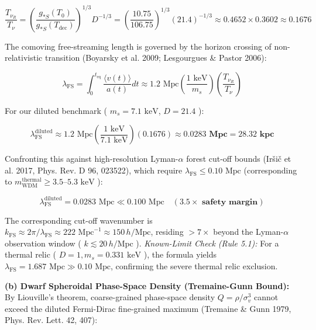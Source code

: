 \documentclass[11pt,a4paper]{article}
\theoremstyle{definition}\newtheorem{definition}{Definition}
\theoremstyle{remark}\newtheorem{remark}{Remark}
\begin{document}
\begin{equation}
\frac{T_{\nu_R}}{T_\nu} = \left(\frac{g_{*S}(T_0)}{g_{*S}(T_{\text{dec}})}\right)^{1/3} D^{-1/3} = \left(\frac{10.75}{106.75}\right)^{1/3} (21.4)^{-1/3} \approx 0.4652 \times 0.3602 \approx \mathbf{0.1676}
\end{equation}


The comoving free-streaming length is governed by the horizon crossing of non-relativistic transition (Boyarsky et al. 2009; Lesgourgues \& Pastor 2006):


\begin{equation}
\lambda_{\text{FS}} = \int_0^{t_{\text{eq}}} \frac{\langle v(t)\rangle}{a(t)} dt \approx 1.2\text{ Mpc} \left(\frac{1\text{ keV}}{m_s}\right) \left(\frac{T_{\nu_R}}{T_\nu}\right)
\end{equation}


For our diluted benchmark ( $m_s = 7.1\text{ keV}$, $D = 21.4$ ):


\begin{equation}
\lambda_{\text{FS}}^{\text{diluted}} \approx 1.2\text{ Mpc} \left(\frac{1\text{ keV}}{7.1\text{ keV}}\right) (0.1676) \approx \mathbf{0.0283\text{ Mpc}} = \mathbf{28.32\text{ kpc}}
\end{equation}


Confronting this against high-resolution Lyman-$\alpha$ forest cut-off bounds (Iršič et al. 2017, Phys. Rev. D 96, 023522), which require $\lambda_{\text{FS}} \le 0.10\text{ Mpc}$ (corresponding to $m_{\text{WDM}}^{\text{thermal}} \ge 3.5\text{--}5.3\text{ keV}$ ):


\begin{equation}
\lambda_{\text{FS}}^{\text{diluted}} = 0.0283\text{ Mpc} \ll 0.100\text{ Mpc} \quad (\mathbf{3.5\times \text{ safety margin}})
\end{equation}


The corresponding cut-off wavenumber is $k_{\text{FS}} \approx 2\pi / \lambda_{\text{FS}} \approx 222\text{ Mpc}^{-1} \approx 150\,h/\text{Mpc}$, residing $> 7\times$ beyond the Lyman-$\alpha$ observation window ( $k \lesssim 20\,h/\text{Mpc}$ ).
\textit{Known-Limit Check (Rule 5.1):} For a thermal relic ( $D=1, m_s = 0.331\text{ keV}$ ), the formula yields $\lambda_{\text{FS}} = 1.687\text{ Mpc} \gg 0.10\text{ Mpc}$, confirming the severe thermal relic exclusion.

\textbf{(b) Dwarf Spheroidal Phase-Space Density (Tremaine-Gunn Bound):}
By Liouville's theorem, coarse-grained phase-space density $Q = \rho / \sigma_v^3$ cannot exceed the diluted Fermi-Dirac fine-grained maximum (Tremaine \& Gunn 1979, Phys. Rev. Lett. 42, 407):
\end{document}
